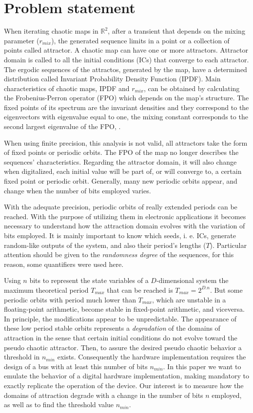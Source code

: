 \section{Problem statement} \label{sec:estudio}

When iterating chaotic maps in $\mathbb{R}^2$, after a transient that depends on the mixing parameter ($r_{mix}$), the generated sequence limits in a point or a collection of points called attractor. A chaotic map can have one or more attractors. Attractor domain is called to all the initial conditions (ICs) that converge to each attractor. The ergodic sequences of the attractos, generated by the map, have a determined distribution called Invariant Probability Density Function (IPDF). Main characteristics of chaotic maps, IPDF and $r_{mix}$, can be obtained by calculating the Frobenius-Perron operator (FPO) which depends on the map's structure. The fixed points of its spectrum are the invariant densities and they correspond to the eigenvectors with eigenvalue equal to one, the mixing constant corresponds to the second largest eigenvalue of the FPO, \cite{Lasota1994,Lasota1973}.

When using finite precision, this analysis is not valid, all attractors take the form of fixed points or periodic orbits. The FPO of the map no longer describes the sequences' characteristics. Regarding the attractor domain, it will also change when digitalized, each initial value will be part of, or will converge to, a certain fixed point or periodic orbit. Generally, many new periodic orbits appear, and change when the number of bits employed varies.

With the adequate precision, periodic orbits of really extended periods can be reached. With the purpose of utilizing them in electronic applications it becomes necessary to understand how the attraction domain evolves with the variation of bits employed. It is mainly important to know which seeds, i. e. ICs, generate random-like outputs of the system, and also their period's lengths ($T$). Particular attention should be given to the \textsl{randomness degree} of the sequences, for this reason, some quantifiers were used here.

Using $n$ bits to represent the state variables of a $D$-dimensional system the maximum theoretical period $T_{max}$ that can be
reached is $T_{max}=2^{D.n}$. But some periodic orbits with period much lower than $T_{max}$, which are unstable in a floating-point arithmetic, become stable in fixed-point arithmetic, and viceversa. In principle, the modifications appear to be unpredictable.
The appearance of these low period stable orbits represents a \textsl{degradation} of the domains of attraction in the sense that certain initial conditions do not evolve toward the pseudo chaotic attractor. Then, to assure the desired pseudo chaotic behavior a threshold in $n_{min}$  exists. Consequently the hardware implementation requires the design of a
bus with at least this number of bits $n_{min}$. 
In this paper we want to emulate the behavior of a digital hardware implementation, making mandatory to 
exactly replicate the operation of the device. Our interest is
to measure how the domains of attraction degrade with a change in
the number of bits $n$ employed, as well as to find the threshold value 
$n_{min}$. 

